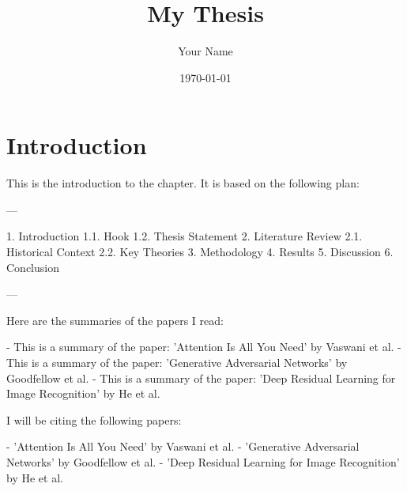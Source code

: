 \documentclass{article}
\title{My Thesis}
\author{Your Name}
\date{\today}
\begin{document}
\maketitle


\section{Introduction}

This is the introduction to the chapter. It is based on the following plan:

---

1. Introduction
   1.1. Hook
   1.2. Thesis Statement
2. Literature Review
   2.1. Historical Context
   2.2. Key Theories
3. Methodology
4. Results
5. Discussion
6. Conclusion


---

Here are the summaries of the papers I read:

- This is a summary of the paper: 'Attention Is All You Need' by Vaswani et al.
- This is a summary of the paper: 'Generative Adversarial Networks' by Goodfellow et al.
- This is a summary of the paper: 'Deep Residual Learning for Image Recognition' by He et al.

I will be citing the following papers: 

- 'Attention Is All You Need' by Vaswani et al.
- 'Generative Adversarial Networks' by Goodfellow et al.
- 'Deep Residual Learning for Image Recognition' by He et al.
\end{document}
